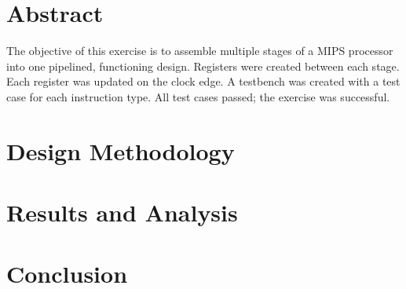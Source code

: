 \documentclass[CMPE]{KGCOEReport}
\begin{document}
\maketitle

\section*{Abstract}

The objective of this exercise is to assemble multiple stages of a MIPS
processor into one pipelined, functioning design. Registers were created
between each stage. Each register was updated on the clock edge. A testbench
was created with a test case for each instruction type. All test cases passed;
the exercise was successful.

\section*{Design Methodology}


\section*{Results and Analysis}


\section*{Conclusion}



\end{document}
